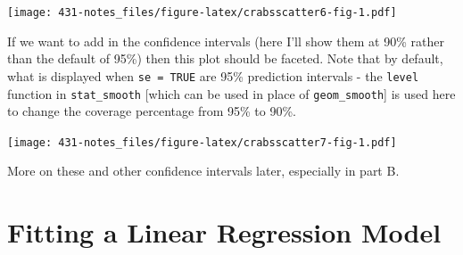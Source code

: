 \documentclass[
]{book}
\newenvironment{Shaded}{\begin{snugshade}}{\end{snugshade}}
\newcommand{\DataTypeTok}[1]{\textcolor[rgb]{0.13,0.29,0.53}{#1}}
\newcommand{\FloatTok}[1]{\textcolor[rgb]{0.00,0.00,0.81}{#1}}
\newcommand{\KeywordTok}[1]{\textcolor[rgb]{0.13,0.29,0.53}{\textbf{#1}}}
\newcommand{\NormalTok}[1]{#1}
\newcommand{\OperatorTok}[1]{\textcolor[rgb]{0.81,0.36,0.00}{\textbf{#1}}}
\newcommand{\OtherTok}[1]{\textcolor[rgb]{0.56,0.35,0.01}{#1}}
\newcommand{\StringTok}[1]{\textcolor[rgb]{0.31,0.60,0.02}{#1}}
\begin{document}
\texttt{[image: 431-notes\_files/figure-latex/crabsscatter6-fig-1.pdf]}

If we want to add in the confidence intervals (here I'll show them at 90\% rather than the default of 95\%) then this plot should be faceted. Note that by default, what is displayed when \texttt{se\ =\ TRUE} are 95\% prediction intervals - the \texttt{level} function in \texttt{stat\_smooth} {[}which can be used in place of \texttt{geom\_smooth}{]} is used here to change the coverage percentage from 95\% to 90\%.

\begin{Shaded}
\end{Shaded}

\texttt{[image: 431-notes\_files/figure-latex/crabsscatter7-fig-1.pdf]}

More on these and other confidence intervals later, especially in part B.

\hypertarget{fitting-a-linear-regression-model}{%
\section{Fitting a Linear Regression Model}\label{fitting-a-linear-regression-model}}
\end{document}
